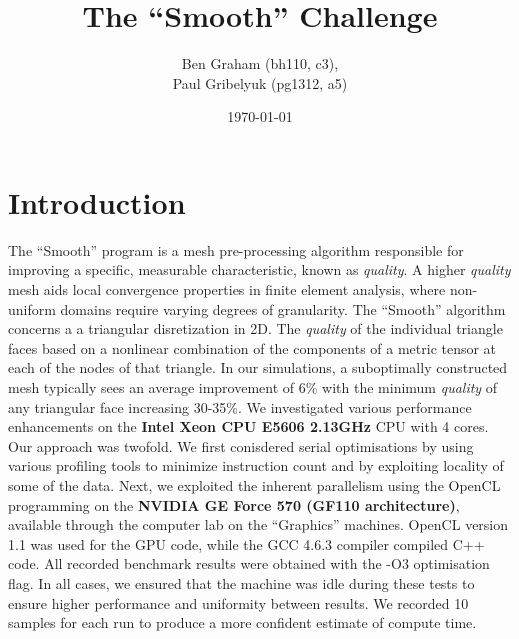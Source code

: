\documentclass[a4paper,11pt, twocolumn]{article}
\author{
    Ben Graham (bh110, c3), \\
    Paul Gribelyuk (pg1312, a5)
}
\date{\today}
\title{The ``Smooth'' Challenge}
\begin{document}
\maketitle
\section{Introduction}
The ``Smooth'' program is a mesh pre-processing algorithm responsible for improving a specific, measurable characteristic, known as \emph{quality}.  A higher \emph{quality} mesh aids local convergence properties in finite element analysis, where non-uniform domains require varying degrees of granularity.  The ``Smooth'' algorithm concerns a a triangular disretization in 2D. The \emph{quality} of the individual triangle faces based on a nonlinear combination of the components of a metric tensor at each of the nodes of that triangle.  In our simulations, a suboptimally constructed mesh typically sees an average improvement of 6\% with the minimum \emph{quality} of any triangular face increasing 30-35\%.  We investigated various performance enhancements on the \textbf{Intel Xeon CPU E5606 2.13GHz} CPU with 4 cores.  Our approach was twofold.  We first conisdered serial optimisations by using various profiling tools to minimize instruction count and by exploiting locality of some of the data.   Next, we exploited the inherent parallelism using the OpenCL programming on the \textbf{NVIDIA GE Force 570 (GF110 architecture)}, available through the computer lab on the ``Graphics'' machines.  OpenCL version 1.1 was used for the GPU code, while the GCC 4.6.3 compiler compiled C++ code.  All recorded benchmark results were obtained with the -O3 optimisation flag.  In all cases, we ensured that the machine was idle during these tests to ensure higher performance and uniformity between results.  We recorded 10 samples for each run to produce a more confident estimate of compute time.
\end{document}
